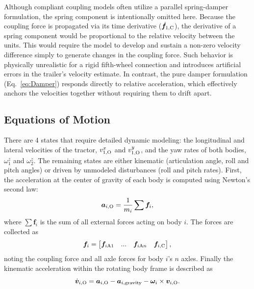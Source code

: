 \documentclass[conference]{IEEEtran}
\begin{document}
Although compliant coupling models often utilize a parallel spring-damper formulation, the spring component is intentionally omitted here. Because the coupling force is propagated via its time derivative ($\dot{\bm{f}}_{1,\text{C}}$), the derivative of a spring component would be proportional to the relative velocity between the units. This would require the model to develop and sustain a non-zero velocity difference simply to generate changes in the coupling force. Such behavior is physically unrealistic for a rigid fifth-wheel connection and introduces artificial errors in the trailer's velocity estimate. In contrast, the pure damper formulation (Eq.~\ref{eq:Damper}) responds directly to relative acceleration, which effectively anchors the velocities together without requiring them to drift apart.

\subsection{Equations of Motion} \label{sec:newtonEuler}
There are 4 states that require detailed dynamic modeling: the longitudinal and lateral velocities of the tractor, $v^x_{1,\text{O}}$ and $v^y_{1,\text{O}}$, and the yaw rates of both bodies, $\omega^z_1$ and $\omega^z_2$. The remaining states are either kinematic (articulation angle, roll and pitch angles) or driven by unmodeled disturbances (roll and pitch rates).
First, the acceleration at the center of gravity of each body is computed using Newton's second law:
\begin{equation}
    \bm a_{i,\text{O}} = \frac{1}{m_i}\sum \bm f_{i}, \label{eq:ForceAcc}
\end{equation}
where $\sum \bm f_{i}$ is the sum of all external forces acting on body $i$. The forces are collected as
\begin{equation}
    \bm f_{i} = \begin{bmatrix}
        \bm{f}_{i \text{A}1} & ... & \bm{f}_{i \text{A} n} & \bm{f}_{i,\text{C}}
    \end{bmatrix},
\end{equation}
noting the coupling force and all axle forces for body $i$'s $n$ axles. Finally the kinematic acceleration within the rotating body frame is described as
\begin{equation}
    \dot{\bm v}_{i,\text{O}} = \bm a_{i,\text{O}} - \bm{a}_{i,\text{gravity}} - \bm\omega_i \times \bm v_{i,\text{O}}. \label{eq:Kinematicacceleration}
\end{equation}
\end{document}
